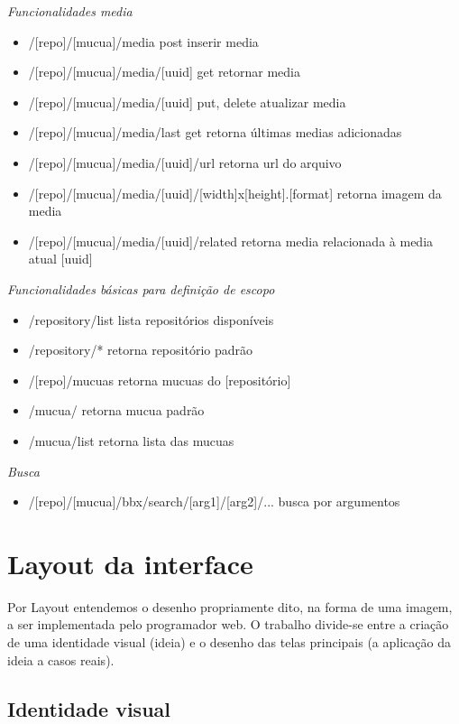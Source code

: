 \emph{Funcionalidades media}
\begin{itemize}
  \item /[repo]/[mucua]/media {post}                inserir media
  \item /[repo]/[mucua]/media/[uuid] {get}          retornar media
  \item /[repo]/[mucua]/media/[uuid] {put, delete}  atualizar media
  \item /[repo]/[mucua]/media/last {get}            retorna últimas medias adicionadas
  \item /[repo]/[mucua]/media/[uuid]/url            retorna url do arquivo
  \item /[repo]/[mucua]/media/[uuid]/[width]x[height].[format]       retorna imagem da media
  \item /[repo]/[mucua]/media/[uuid]/related        retorna media relacionada à media atual [uuid]
\end{itemize}

\emph{Funcionalidades básicas para definição de escopo}
\begin{itemize}
  \item /repository/list                     lista repositórios disponíveis
  \item /repository/*                        retorna repositório padrão
  \item /[repo]/mucuas                       retorna mucuas do [repositório]
  \item /mucua/                              retorna mucua padrão
  \item /mucua/list                          retorna lista das mucuas
\end{itemize}

\emph{Busca}
\begin{itemize}
  \item /[repo]/[mucua]/bbx/search/[arg1]/[arg2]/...  busca por argumentos
\end{itemize}

\section{Layout da interface}
Por Layout entendemos o desenho propriamente dito, na forma de uma
imagem, a ser implementada pelo programador web. O trabalho divide-se
entre a criação de uma identidade visual (ideia) e o desenho das
telas principais (a aplicação da ideia a casos reais).

\subsection{Identidade visual}

